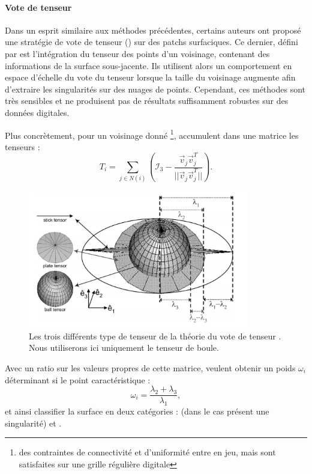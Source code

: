 \paragraph{Vote de tenseur}
%
%
Dans un esprit similaire aux méthodes précédentes, certains auteurs
\cite{Park2012} ont proposé une stratégie de vote de tenseur () sur des patchs surfaciques. Ce dernier, défini par
 est l'intégration du tenseur des points d'un
voisinage, contenant des informations de la surface sous-jacente. Ils utilisent
alors un comportement en espace d'échelle du vote du tenseur lorsque la taille du
voisinage augmente afin d'extraire les singularités sur des nuages de points.
Cependant, ces méthodes sont très sensibles et ne produisent pas de résultats
suffisamment robustes sur des données digitales.


Plus concrètement, pour un voisinage donné \footnote{des contraintes de
connectivité et d'uniformité entre en jeu, mais sont satisfaites sur une grille
régulière digitale},  accumulent dans une matrice les
tenseurs :
%
\begin{equation}
  T_i = \sum\limits_{j \in N(i)} \left(\mathcal{I}_3 - \frac{\overrightarrow{v}_j\overrightarrow{v}_j^T}{||\overrightarrow{v}_j\overrightarrow{v}_j^T||} \right) .
\end{equation}
%
\begin{figure}[ht]{
    \begin{center}
    \includegraphics[height=6cm]{images/Feature/Tensor_voting_notations}
    \end{center}}
    \caption{Les trois différents type de tenseur de la théorie du vote de tenseur \cite{Medioni2000-2}. Nous utiliserons ici uniquement le tenseur de boule.
      \label{fig:mellado-multiscale}}
\end{figure}
%
Avec un ratio sur les valeurs propres de cette matrice,  veulent
obtenir un poids $\omega_i$ déterminant si le point caractéristique :
%
\begin{equation}
  \omega_i = \frac{\lambda_2 + \lambda_3}{\lambda_1},
\end{equation}
%
et ainsi classifier la surface en deux catégories : \Feature (\cad dans le cas
présent une singularité) et \NonFeature.


